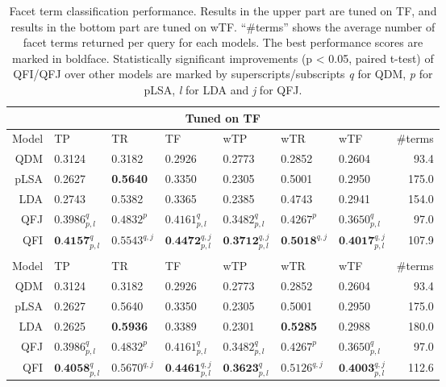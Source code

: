 \begin{table}[!htbp]
\centering
\caption{Facet term classification performance. Results in the upper part are tuned on TF, and results in the bottom part are tuned on wTF. ``\#terms'' shows the average number of facet terms returned per query for each models. The best performance scores are marked in boldface. Statistically significant improvements (p < 0.05, paired t-test) of QFI/QFJ over other models are marked by superscripts/subscripts \textit{q} for QDM, \textit{p} for pLSA, \textit{l} for LDA and \textit{j} for QFJ.}
\label{tab:intrinsic-tf}
\setlength\tabcolsep{4pt}
\begin{tabular}{|r|l|l|l|l|l|l|r|} \hline
\multicolumn{8}{|c|}{Tuned on TF} \\\hline
Model& TP & TR & TF & wTP & wTR & wTF & \#terms \\ \hline
QDM & 0.3124 & 0.3182 & 0.2926 & 0.2773 & 0.2852 & 0.2604 & 93.4 \\\hline
pLSA & 0.2627 & \textbf{0.5640} & 0.3350 & 0.2305 & 0.5001 & 0.2950 & 175.0 \\ \hline
LDA & 0.2743 & 0.5382 & 0.3365 & 0.2385 & 0.4743 & 0.2941 & 154.0 \\ \hline
QFJ & $0.3986^{q}_{p,l}$ & $0.4832^{p}$ & $0.4161^{q}_{p,l}$ & $0.3482^{q}_{p,l}$ & $0.4267^{p}$ & $0.3650^{q}_{p,l}$ & 97.0 \\ \hline
QFI & $\textbf{0.4157}^{q}_{p,l}$ & $0.5543^{q,j}$ & $\textbf{0.4472}^{q,j}_{p,l}$ & $\textbf{0.3712}^{q,j}_{p,l}$ & $\textbf{0.5018}^{q,j}$ & $\textbf{0.4017}^{q,j}_{p,l}$ & 107.9 \\ 
\hhline{|========|}
\multicolumn{8}{|c|}{Tuned on wTF} \\\hline
Model& TP & TR & TF & wTP & wTR & wTF & \#terms \\ \hline
QDM & 0.3124 & 0.3182 & 0.2926 & 0.2773 & 0.2852 & 0.2604 & 93.4 \\ \hline
pLSA & 0.2627 & 0.5640 & 0.3350 & 0.2305 & 0.5001 & 0.2950 & 175.0 \\ \hline
LDA & 0.2625 & \textbf{0.5936} & 0.3389 & 0.2301 & \textbf{0.5285} & 0.2988 & 180.0 \\ \hline
QFJ & $0.3986^{q}_{p,l}$ & $0.4832^{p}$ & $0.4161^{q}_{p,l}$ & $0.3482^{q}_{p,l}$ & $0.4267^{p}$ & $0.3650^{q}_{p,l}$ & 97.0 \\ \hline
QFI & $\textbf{0.4058}^{q}_{p,l}$ & $0.5670^{q,j}$ & $\textbf{0.4461}^{q,j}_{p,l}$ & $\textbf{0.3623}^{q}_{p,l}$ & $0.5126^{q,j}$ & $\textbf{0.4003}^{q,j}_{p,l}$ & 112.6 \\ \hline
\end{tabular}
\end{table}

